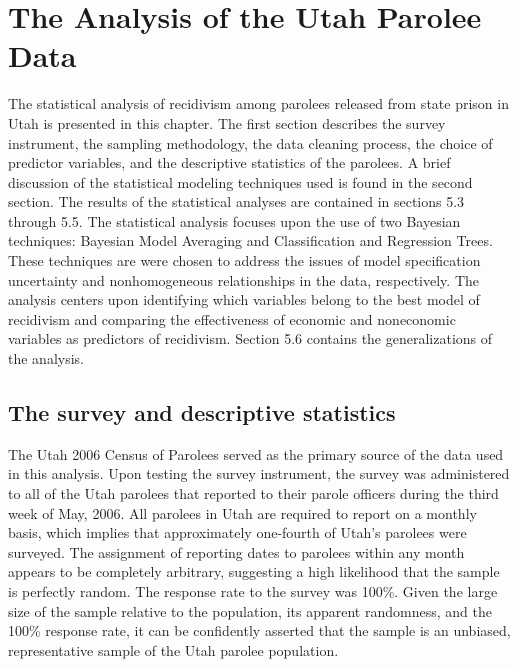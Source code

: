 \chapter{The Analysis of the Utah Parolee Data}

The statistical analysis of recidivism among parolees released from state prison in Utah is presented in this chapter.  The first section describes the survey instrument, the sampling methodology, the data cleaning process, the choice of predictor variables, and the descriptive statistics of the parolees.  A brief discussion of the statistical modeling techniques used is found in the second section.  The results of the statistical analyses are contained in sections 5.3 through 5.5.  The statistical analysis focuses upon the use of two Bayesian techniques:  Bayesian Model Averaging and Classification and Regression Trees.  These techniques are were chosen to address the issues of model specification uncertainty and nonhomogeneous relationships in the data, respectively. The analysis centers upon identifying which variables belong to the best model of recidivism and comparing the effectiveness of economic and noneconomic variables as predictors of recidivism.  Section 5.6 contains the generalizations of the analysis.

\section{The survey and descriptive statistics}

The Utah 2006 Census of Parolees served as the primary source of the data used in this analysis.  Upon testing the survey instrument, the survey was administered to all of the Utah parolees that reported to their parole officers during the third week of May, 2006.  All parolees in Utah are required to report on a monthly basis, which implies that approximately one-fourth of Utah's parolees were surveyed.  The assignment of reporting dates to parolees within any month appears to be completely arbitrary, suggesting a high likelihood that the sample is perfectly random. The response rate to the survey was 100\%.  Given the large size of the sample relative to the population, its apparent randomness, and the 100\% response rate, it can be confidently asserted that the sample is an unbiased, representative sample of the Utah parolee population.

